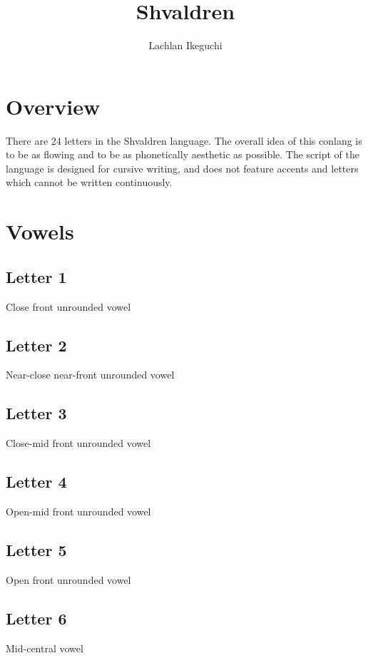\documentclass{book}
\title{Shvaldren}
\author{Lachlan Ikeguchi}
\newcommand{\display}[1]{\begin{center}\resizebox{2cm}{!}{\texttt{[image: \#1]}}\end{center}}
\begin{document}
\maketitle
\tableofcontents

\chapter{Overview}
There are 24 letters in the Shvaldren language.  The overall idea of this conlang is to be as flowing and to be as phonetically aesthetic as possible.  The script of the language is designed for cursive writing, and does not feature accents and letters which cannot be written continuously.


\chapter{Vowels}
\section{Letter 1}
Close front unrounded vowel

\display{letters/vowels/1.JPG}


\section{Letter 2}
Near-close near-front unrounded vowel

\display{letters/vowels/2.JPG}


\section{Letter 3}
Close-mid front unrounded vowel

\display{letters/vowels/3.JPG}


\section{Letter 4}
Open-mid front unrounded vowel

\display{letters/vowels/4.JPG}


\section{Letter 5}
Open front unrounded vowel

\display{letters/vowels/5.JPG}


\section{Letter 6}
Mid-central vowel
\end{document}
